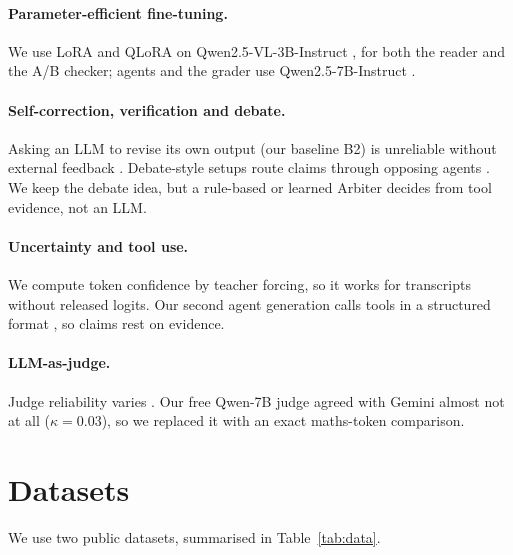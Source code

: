 \documentclass[11pt]{article}
\begin{document}
\paragraph{Parameter-efficient fine-tuning.} We use LoRA \citep{hu2022lora} and QLoRA \citep{dettmers2023qlora} on Qwen2.5-VL-3B-Instruct \citep{qwen25vl}, for both the reader and the A/B checker; agents and the grader use Qwen2.5-7B-Instruct \citep{qwen25}.

\paragraph{Self-correction, verification and debate.} Asking an LLM to revise its own output (our baseline B2) is unreliable without external feedback \citep{huang2024selfcorrect}. Debate-style setups route claims through opposing agents \citep{irving2018debate,du2024debate}. We keep the debate idea, but a rule-based or learned Arbiter decides from tool evidence, not an LLM.

\paragraph{Uncertainty and tool use.} We compute token confidence by teacher forcing, so it works for transcripts without released logits. Our second agent generation calls tools in a structured format \citep{schick2023toolformer}, so claims rest on evidence.

\paragraph{LLM-as-judge.} Judge reliability varies \citep{zheng2023judge}. Our free Qwen-7B judge agreed with Gemini almost not at all ($\kappa=0.03$), so we replaced it with an exact maths-token comparison.

\section{Datasets}

We use two public datasets, summarised in Table~\ref{tab:data}.
\end{document}
